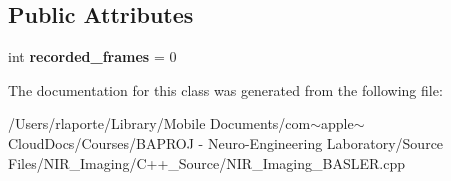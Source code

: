 \subsection*{Public Attributes}
\begin{DoxyCompactItemize}
\item 
\mbox{\label{class_custom_image_event_handler_a2db3a98b441e949ff23b160a4f8b589b}} 
int {\bfseries recorded\+\_\+frames} = 0
\end{DoxyCompactItemize}


The documentation for this class was generated from the following file\+:\begin{DoxyCompactItemize}
\item 
/\+Users/rlaporte/\+Library/\+Mobile Documents/com$\sim$apple$\sim$\+Cloud\+Docs/\+Courses/\+B\+A\+P\+R\+O\+J -\/ Neuro-\/\+Engineering Laboratory/\+Source Files/\+N\+I\+R\+\_\+\+Imaging/\+C++\+\_\+\+Source/N\+I\+R\+\_\+\+Imaging\+\_\+\+B\+A\+S\+L\+E\+R.\+cpp\end{DoxyCompactItemize}

